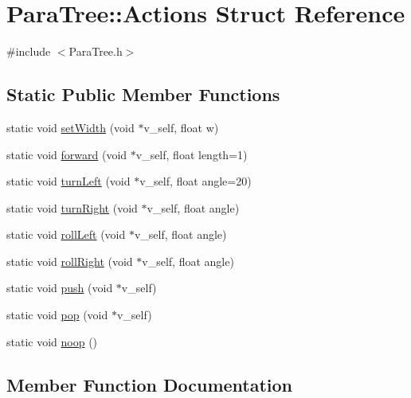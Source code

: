 \hypertarget{struct_para_tree_1_1_actions}{}\section{Para\+Tree\+:\+:Actions Struct Reference}
\label{struct_para_tree_1_1_actions}


{\ttfamily \#include $<$Para\+Tree.\+h$>$}

\subsection*{Static Public Member Functions}
\begin{DoxyCompactItemize}
\item 
static void \hyperlink{struct_para_tree_1_1_actions_ab5e142c83527930f31b90056a5db87b3}{set\+Width} (void $\ast$v\+\_\+self, float w)
\item 
static void \hyperlink{struct_para_tree_1_1_actions_a6d369decf87886a204ea1cb477821276}{forward} (void $\ast$v\+\_\+self, float length=1)
\item 
static void \hyperlink{struct_para_tree_1_1_actions_a8dfa769d92c5727a8980dcecf7fe833a}{turn\+Left} (void $\ast$v\+\_\+self, float angle=20)
\item 
static void \hyperlink{struct_para_tree_1_1_actions_abc1ca476c25664aaec5ca584056e75df}{turn\+Right} (void $\ast$v\+\_\+self, float angle)
\item 
static void \hyperlink{struct_para_tree_1_1_actions_a85239f26eec51850f940e0661f933611}{roll\+Left} (void $\ast$v\+\_\+self, float angle)
\item 
static void \hyperlink{struct_para_tree_1_1_actions_a69b88c947538c5fa1c76abf071eeff96}{roll\+Right} (void $\ast$v\+\_\+self, float angle)
\item 
static void \hyperlink{struct_para_tree_1_1_actions_aa4b68284e50477f6f82a067c8fddca89}{push} (void $\ast$v\+\_\+self)
\item 
static void \hyperlink{struct_para_tree_1_1_actions_aacfd900a2850846fc5eea14702e1fed1}{pop} (void $\ast$v\+\_\+self)
\item 
static void \hyperlink{struct_para_tree_1_1_actions_ae3c41952afcf85ad4646ae1f11de4571}{noop} ()
\end{DoxyCompactItemize}


\subsection{Member Function Documentation}
